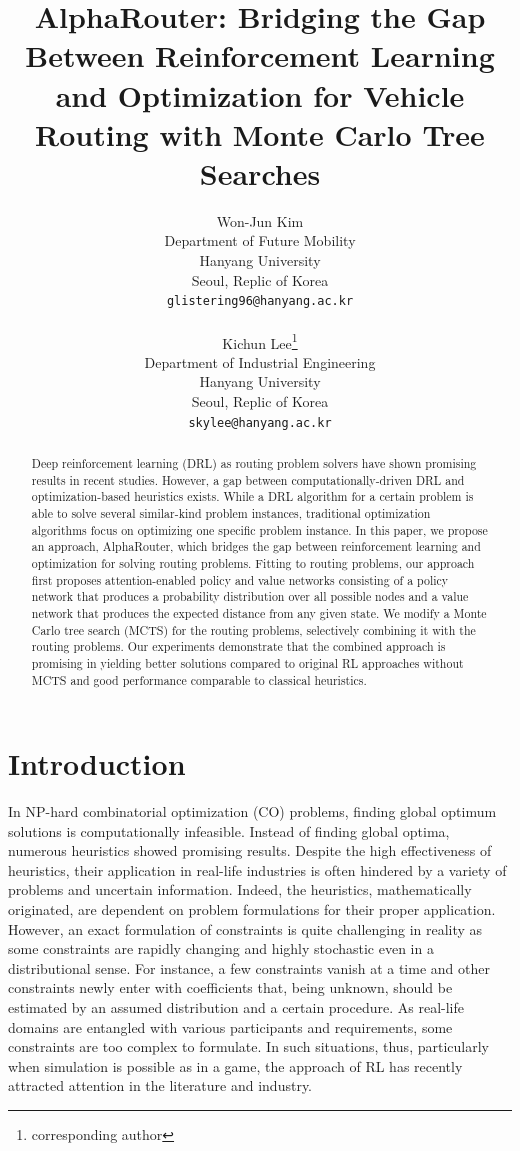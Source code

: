 \documentclass{article}
\title{AlphaRouter: Bridging the Gap Between Reinforcement Learning and Optimization for Vehicle Routing with Monte Carlo Tree Searches}
\author{%
  Won-Jun Kim \\
  Department of Future Mobility\\
  Hanyang University\\
  Seoul, Replic of Korea \\
  \texttt{glistering96@hanyang.ac.kr} \\   \\
   Kichun Lee\thanks{corresponding author} \\
  Department of Industrial Engineering\\
  Hanyang University\\
  Seoul, Replic of Korea \\
   \texttt{skylee@hanyang.ac.kr} \\
}
\begin{document}
\maketitle


\begin{abstract}
Deep reinforcement learning (DRL) as routing problem solvers have shown promising results in recent studies. However, a gap between computationally-driven DRL and optimization-based heuristics exists. While a DRL algorithm for a certain problem is able to solve several similar-kind problem instances, traditional optimization algorithms focus on optimizing one specific problem instance. In this paper, we propose an approach, AlphaRouter, which bridges the gap between reinforcement learning and optimization for solving routing problems. Fitting to routing problems, our approach first proposes attention-enabled policy and value networks consisting of a policy network that produces a probability distribution over all possible nodes and a value network that produces the expected distance from any given state. We modify a Monte Carlo tree search (MCTS) for the routing problems, selectively combining it with the routing problems.  Our experiments demonstrate that the combined approach is promising in yielding better solutions compared to original RL approaches without MCTS and good performance comparable to classical heuristics.
\end{abstract}


\section{Introduction}

In NP-hard combinatorial optimization (CO) problems, finding global optimum solutions is computationally infeasible. Instead of finding global optima, numerous heuristics showed promising results. Despite the high effectiveness of heuristics, their application in real-life industries is often hindered by a variety of problems and uncertain information.
Indeed, the heuristics, mathematically originated, are dependent on problem formulations for their proper application. However,
an exact formulation of constraints is quite challenging in reality
as some constraints are rapidly changing and highly stochastic even in a distributional sense.
For instance, a few constraints vanish at a time and other constraints newly enter with coefficients that, being unknown, should be estimated by an assumed distribution and a certain procedure.
As real-life domains are entangled with various participants and requirements, some constraints are too complex to formulate.
In such situations, thus, particularly when simulation is possible as in a game, the approach of RL has recently attracted attention in the literature and industry.
\end{document}
